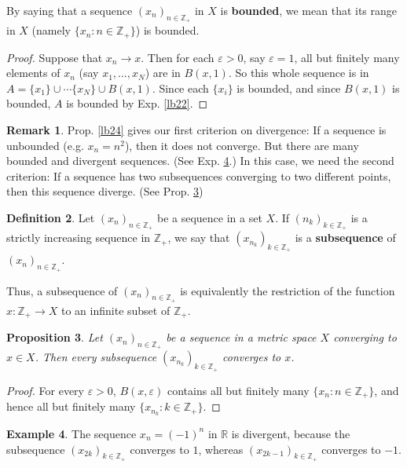 \documentclass[12pt,b5paper,notitlepage]{article}
\theoremstyle{definition}
\newtheorem{df}{Definition}[section]
\newtheorem{eg}[df]{Example}
\newtheorem{rem}[df]{Remark}
\theoremstyle{plain}
\newtheorem{pp}[df]{Proposition}
\newcommand{\Zbb}{\mathbb Z}
\newcommand{\Rbb}{\mathbb R}
\numberwithin{equation}{section}
\begin{document}
By saying that a sequence  $(x_n)_{n\in\Zbb_+}$ in $X$ is \textbf{bounded}, we mean that its range in $X$ (namely $\{x_n:n\in\Zbb_+\}$) is bounded.

\begin{proof}
Suppose that $x_n\rightarrow x$. Then for each $\varepsilon>0$, say $\varepsilon=1$, all but finitely many elements of $x_n$ (say $x_1,\dots,x_N$) are in $B(x,1)$. So this whole sequence is in $A=\{x_1\}\cup\cdots\{x_N\}\cup B(x,1)$. Since each $\{x_i\}$ is bounded, and since $B(x,1)$ is bounded, $A$ is bounded by Exp. \ref{lb22}.
\end{proof}


\begin{rem}\label{lb26}
Prop. \ref{lb24} gives our first criterion on divergence: If a sequence is unbounded (e.g. $x_n=n^2$), then it does not converge. But there are many bounded and divergent sequences. (See Exp. \ref{lb25}.) In this case, we need the second criterion: If a sequence has two subsequences converging to two different points, then this sequence diverge. (See Prop. \ref{lb23})
\end{rem}




\begin{df}
Let $(x_n)_{n\in\Zbb_+}$ be a sequence in a set $X$. If $(n_k)_{k\in\Zbb_+}$ is a strictly increasing sequence in $\Zbb_+$, we say that $(x_{n_k})_{k\in\Zbb_+}$ is a \textbf{subsequence} of $(x_n)_{n\in\Zbb_+}$. 
\end{df}



Thus, a subsequence of $(x_n)_{n\in\Zbb_+}$ is equivalently the restriction of the function $x:\Zbb_+\rightarrow X$ to an infinite subset of $\Zbb_+$.

\begin{pp}\label{lb23}
Let $(x_n)_{n\in\Zbb_+}$ be a sequence in a metric space $X$ converging to $x\in X$. Then every subsequence $(x_{n_k})_{k\in\Zbb_+}$ converges to $x$.
\end{pp}

\begin{proof}
For every $\varepsilon>0$, $B(x,\varepsilon)$ contains all but finitely many $\{x_n:n\in\Zbb_+\}$, and hence all but finitely many $\{x_{n_k}:k\in\Zbb_+\}$.
\end{proof}

\begin{eg}\label{lb25}
The sequence $x_n=(-1)^n$ in $\Rbb$ is divergent, because the subsequence $(x_{2k})_{k\in\Zbb_+}$ converges to $1$, whereas $(x_{2k-1})_{k\in\Zbb_+}$ converges to $-1$. 
\end{eg}
\end{document}
